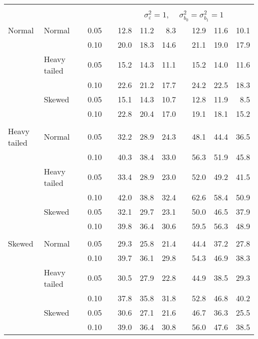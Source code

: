 \begin{table}[ht]
\begin{scriptsize}
\begin{tabular}{ll p{.1cm} c p{.1cm} rrr p{.1cm} rrr}
&&&&&&&&&&&\\
& && && \multicolumn{7}{c}{$\sigma_{\varepsilon}^2 = 1$, \ \ $\sigma_{b_0}^2 = \sigma_{b_1}^2 = 1$} \\ \cline{6-12}
 \rowcolor{gray!20} Normal & Normal &  & 0.05 &  & 12.8 & 11.2 & 8.3 &  & 12.9 & 11.6 & 10.1 \\ 
 \rowcolor{gray!20}    &  &  & 0.10 &  & 20.0 & 18.3 & 14.6 &  & 21.1 & 19.0 & 17.9 \\ 
 \rowcolor{gray!20}    & Heavy tailed &  & 0.05 &  & 15.2 & 14.3 & 11.1 &  & 15.2 & 14.0 & 11.6 \\ 
 \rowcolor{gray!20}    &  &  & 0.10 &  & 22.6 & 21.2 & 17.7 &  & 24.2 & 22.5 & 18.3 \\ 
 \rowcolor{gray!20}    & Skewed &  & 0.05 &  & 15.1 & 14.3 & 10.7 &  & 12.8 & 11.9 & 8.5 \\ 
 \rowcolor{gray!20}    &  &  & 0.10 &  & 22.8 & 20.4 & 17.0 &  & 19.1 & 18.1 & 15.2 \\ 
 &&&&&&&&&&&\\ 
   Heavy tailed & Normal &  & 0.05 &  & 32.2 & 28.9 & 24.3 &  & 48.1 & 44.4 & 36.5 \\ 
   &  &  & 0.10 &  & 40.3 & 38.4 & 33.0 &  & 56.3 & 51.9 & 45.8 \\ 
   & Heavy tailed &  & 0.05 &  & 33.4 & 28.9 & 23.0 &  & 52.0 & 49.2 & 41.5 \\ 
   &  &  & 0.10 &  & 42.0 & 38.8 & 32.4 &  & 62.6 & 58.4 & 50.9 \\ 
   & Skewed &  & 0.05 &  & 32.1 & 29.7 & 23.1 &  & 50.0 & 46.5 & 37.9 \\ 
   &  &  & 0.10 &  & 39.8 & 36.4 & 30.6 &  & 59.5 & 56.3 & 48.9 \\ 
 &&&&&&&&&&&\\ 
   Skewed & Normal &  & 0.05 &  & 29.3 & 25.8 & 21.4 &  & 44.4 & 37.2 & 27.8 \\ 
   &  &  & 0.10 &  & 39.7 & 36.1 & 29.8 &  & 54.3 & 46.9 & 38.3 \\ 
   & Heavy tailed &  & 0.05 &  & 30.5 & 27.9 & 22.8 &  & 44.9 & 38.5 & 29.3 \\ 
   &  &  & 0.10 &  & 37.8 & 35.8 & 31.8 &  & 52.8 & 46.8 & 40.2 \\ 
   & Skewed &  & 0.05 &  & 30.6 & 27.1 & 21.6 &  & 46.7 & 36.3 & 25.5 \\ 
   &  &  & 0.10 &  & 39.0 & 36.4 & 30.8 &  & 56.0 & 47.6 & 38.5 \\ 




\end{tabular}
\end{scriptsize}
\end{table}
